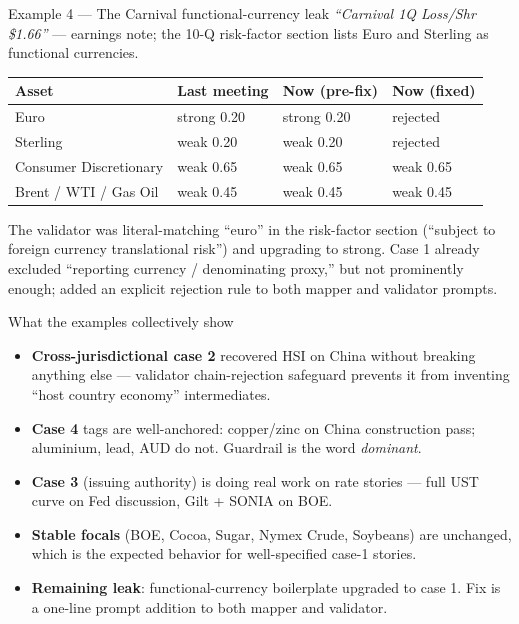 \documentclass[10pt,aspectratio=169]{beamer}
\begin{document}
\begin{frame}{Example 4 --- The Carnival functional-currency leak}
  \footnotesize
  \textit{``Carnival 1Q Loss/Shr \$1.66''} --- earnings note; the 10-Q risk-factor
  section lists Euro and Sterling as functional currencies.

  \medskip
  \begin{tabular}{@{}lll@{}}
    \toprule
    \textbf{Asset} & \textbf{Last meeting} & \textbf{Now (pre-fix)} & \textbf{Now (fixed)} \\
    \midrule
    Euro      & strong 0.20 & strong 0.20 & \textcolor{YaleAccent}{rejected} \\
    Sterling  & weak 0.20   & weak 0.20   & \textcolor{YaleAccent}{rejected} \\
    Consumer Discretionary & \textcolor{YaleGray}{weak 0.65} & weak 0.65 & weak 0.65 \\
    Brent / WTI / Gas Oil & \textcolor{YaleGray}{weak 0.45} & weak 0.45 & weak 0.45 \\
    \bottomrule
  \end{tabular}

  \medskip
  The validator was literal-matching ``euro'' in the risk-factor section
  (``subject to foreign currency translational risk'') and upgrading to strong.
  Case 1 already excluded ``reporting currency / denominating proxy,'' but not
  prominently enough; added an explicit rejection rule to both mapper and
  validator prompts.
\end{frame}

\begin{frame}{What the examples collectively show}
  \small
  \begin{itemize}
    \item \textbf{Cross-jurisdictional case 2} recovered HSI on China without
          breaking anything else --- validator chain-rejection safeguard prevents
          it from inventing ``host country economy'' intermediates.
    \item \textbf{Case 4} tags are well-anchored: copper/zinc on China
          construction pass; aluminium, lead, AUD do not. Guardrail is the
          word \emph{dominant}.
    \item \textbf{Case 3} (issuing authority) is doing real work on rate stories
          --- full UST curve on Fed discussion, Gilt + SONIA on BOE.
    \item \textbf{Stable focals} (BOE, Cocoa, Sugar, Nymex Crude, Soybeans)
          are unchanged, which is the expected behavior for well-specified
          case-1 stories.
    \item \textbf{Remaining leak}: functional-currency boilerplate upgraded to
          case 1. Fix is a one-line prompt addition to both mapper and
          validator.
  \end{itemize}
\end{frame}
\end{document}
